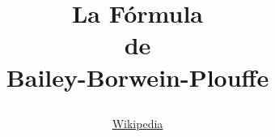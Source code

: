 \documentclass[12pt,spanish]{article}
\title
{
\HRule
\begin{flushright}
\huge
\textbf{La Fórmula}\\
\Large
\textbf{de}\\
\Huge
\textbf{Bailey-Borwein-Plouffe}\\
\end{flushright}
\HRule 
}
\author{\large \href{https://is.gd/xdhiYD}{Wikipedia}}
\theoremstyle{definition}
\theoremstyle{remark}
\begin{document}
\maketitle



\tableofcontents











\nocite{bai}


\end{document}
